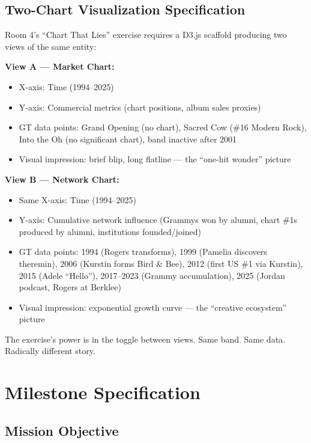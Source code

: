 \documentclass[11pt,letterpaper]{article}
\newcommand{\stageheader}[2]{%
  \noindent\colorbox{#2}{\makebox[\textwidth][l]{%
    \textcolor{white}{\bfseries\sffamily\hspace{6pt}#1\hspace{6pt}}}}%
  \vspace{0.5em}\par%
}
\begin{document}
\subsection{Two-Chart Visualization Specification}

Room 4's ``Chart That Lies'' exercise requires a D3.js scaffold producing two views of the same entity:

\textbf{View A --- Market Chart:}
\begin{itemize}[leftmargin=2em]
\item X-axis: Time (1994--2025)
\item Y-axis: Commercial metrics (chart positions, album sales proxies)
\item GT data points: Grand Opening (no chart), Sacred Cow (\#16 Modern Rock), Into the Oh (no significant chart), band inactive after 2001
\item Visual impression: brief blip, long flatline --- the ``one-hit wonder'' picture
\end{itemize}

\textbf{View B --- Network Chart:}
\begin{itemize}[leftmargin=2em]
\item Same X-axis: Time (1994--2025)
\item Y-axis: Cumulative network influence (Grammys won by alumni, chart \#1s produced by alumni, institutions founded/joined)
\item GT data points: 1994 (Rogers transforms), 1999 (Pamelia discovers theremin), 2006 (Kurstin forms Bird \& Bee), 2012 (first US \#1 via Kurstin), 2015 (Adele ``Hello''), 2017--2023 (Grammy accumulation), 2025 (Jordan podcast, Rogers at Berklee)
\item Visual impression: exponential growth curve --- the ``creative ecosystem'' picture
\end{itemize}

The exercise's power is in the toggle between views. Same band. Same data. Radically different story.

\newpage
\stageheader{STAGE 3 --- MISSION PACKAGE}{tertiary}

\section{Milestone Specification}

\subsection{Mission Objective}
\end{document}
